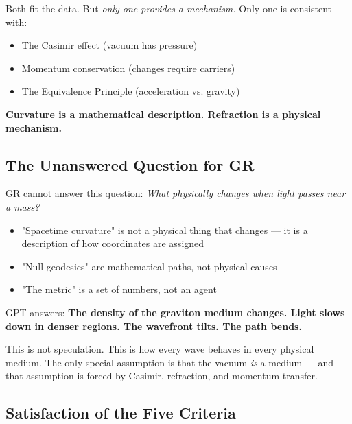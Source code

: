 \documentclass[12pt, a4paper]{article}
\begin{document}
Both fit the data. But \textit{only one provides a mechanism.} Only one is consistent with:
\begin{itemize}
    \item The Casimir effect (vacuum has pressure)
    \item Momentum conservation (changes require carriers)
    \item The Equivalence Principle (acceleration vs. gravity)
\end{itemize}

\textbf{Curvature is a mathematical description. Refraction is a physical mechanism.}

\subsection{The Unanswered Question for GR}
\label{subsec:unanswered_question}

GR cannot answer this question: \textit{What physically changes when light passes near a mass?}

\begin{itemize}
    \item "Spacetime curvature" is not a physical thing that changes — it is a description of how coordinates are assigned
    \item "Null geodesics" are mathematical paths, not physical causes
    \item "The metric" is a set of numbers, not an agent
\end{itemize}

GPT answers: \textbf{The density of the graviton medium changes. Light slows down in denser regions. The wavefront tilts. The path bends.}

This is not speculation. This is how every wave behaves in every physical medium. The only special assumption is that the vacuum \textit{is} a medium — and that assumption is forced by Casimir, refraction, and momentum transfer.

\subsection{Satisfaction of the Five Criteria}
\label{subsec:light_criteria}
\end{document}
